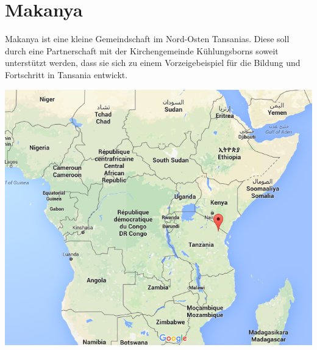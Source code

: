 \section{Makanya}
Makanya ist eine kleine Gemeindschaft im Nord-Osten Tansanias.
Diese soll durch eine Partnerschaft mit der Kirchengemeinde Kühlungsborns
soweit unterstützt werden, dass sie sich zu einem Vorzeigebeispiel für die
Bildung und Fortschritt in Tansania entwickt.
\begin{center}
    \includegraphics[width=\linewidth]{imgs/gomaps.png}
\end{center}

